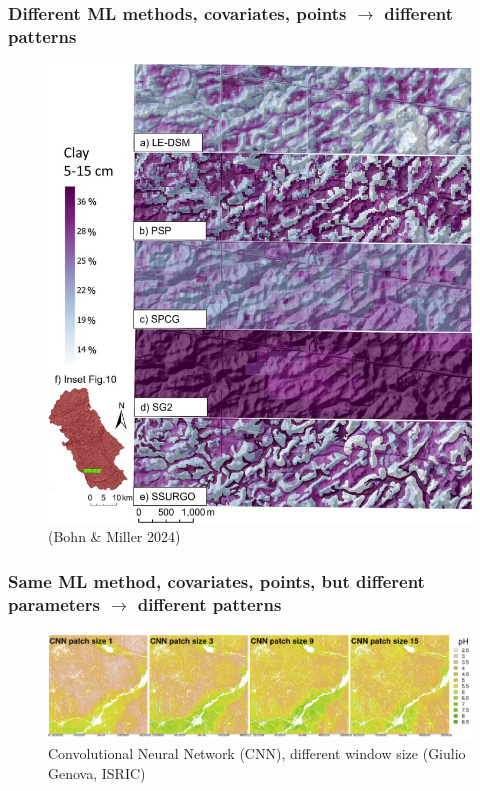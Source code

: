 \documentclass[aspectratio=169]{beamer}
\begin{document}
\begin{frame}
  \frametitle{Different ML methods, covariates,  points $\to$ different patterns}
    \begin{figure}
        \centering
        \includegraphics[height=0.7\textheight]{./graphics_david/1-s2.0-S0016706124000107-gr11.jpg}
        \\(Bohn \& Miller 2024)
    \end{figure}
\end{frame}

\begin{frame}
  \frametitle{\textbf{Same} ML method, covariates, points, but different
    \textbf{parameters} $\to$ different patterns}
    \begin{figure}
        \centering
        \includegraphics[width=\textwidth]{./graphics_david/GenovaPosterFig1a.png}
        \\{Convolutional Neural Network (CNN), different window size (Giulio Genova, ISRIC)}
    \end{figure}
\end{frame}
\end{document}
